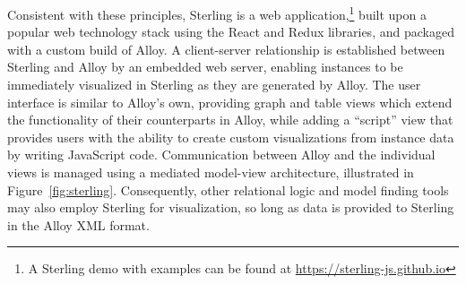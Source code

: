 \documentclass[runningheads]{llncs}
\begin{document}
Consistent with these principles, Sterling is a web application,\footnote{A Sterling demo with examples can be found at \href{https://sterling-js.github.io}{https://sterling-js.github.io}} built upon a popular web technology stack using the React and Redux libraries, and packaged with a custom build of Alloy.
A client-server relationship is established between Sterling and Alloy by an embedded web server, enabling instances to be immediately visualized in Sterling as they are generated by Alloy.
The user interface is similar to Alloy's own, providing graph and table views which extend the functionality of their counterparts in Alloy, while adding a ``script'' view that provides users with the ability to create custom visualizations from instance data by writing JavaScript code.
Communication between Alloy and the individual views is managed using a mediated model-view architecture, illustrated in Figure~\ref{fig:sterling}. Consequently, other relational logic and model finding tools may also employ Sterling for visualization, so long as data is provided to Sterling in the Alloy XML format.

\end{document}
